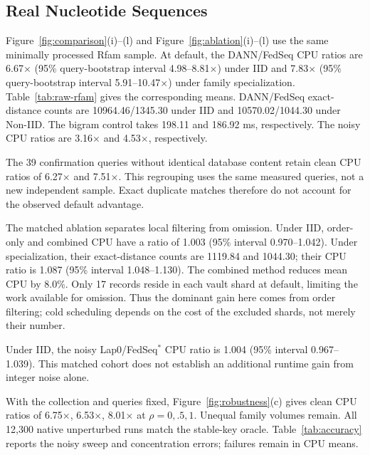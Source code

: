\subsection{Real Nucleotide Sequences}
\label{sec:real}

Figure~\ref{fig:comparison}(i)--(l) and Figure~\ref{fig:ablation}(i)--(l) use the same minimally processed Rfam sample. At default, the DANN/FedSeq CPU ratios are 6.67$\times$ (95\% query-bootstrap interval 4.98--8.81$\times$) under IID and 7.83$\times$ (95\% query-bootstrap interval 5.91--10.47$\times$) under family specialization. Table~\ref{tab:raw-rfam} gives the corresponding means. DANN/FedSeq exact-distance counts are 10964.46/1345.30 under IID and 10570.02/1044.30 under Non-IID. The bigram control takes 198.11 and 186.92 ms, respectively. The noisy CPU ratios are 3.16$\times$ and 4.53$\times$, respectively.

The 39 confirmation queries without identical database content retain clean CPU ratios of 6.27$\times$ and 7.51$\times$. This regrouping uses the same measured queries, not a new independent sample. Exact duplicate matches therefore do not account for the observed default advantage.

The matched ablation separates local filtering from omission. Under IID, order-only and combined CPU have a ratio of 1.003 (95\% interval 0.970--1.042). Under specialization, their exact-distance counts are 1119.84 and 1044.30; their CPU ratio is 1.087 (95\% interval 1.048--1.130). The combined method reduces mean CPU by 8.0\%. Only 17 records reside in each vault shard at default, limiting the work available for omission. Thus the dominant gain here comes from order filtering; cold scheduling depends on the cost of the excluded shards, not merely their number.

Under IID, the noisy Lap0/FedSeq$^*$ CPU ratio is 1.004 (95\% interval 0.967--1.039). This matched cohort does not establish an additional runtime gain from integer noise alone.

With the collection and queries fixed, Figure~\ref{fig:robustness}(c) gives clean CPU ratios of 6.75$\times$, 6.53$\times$, 8.01$\times$ at $\rho=0,.5,1$. Unequal family volumes remain. All 12,300 native unperturbed runs match the stable-key oracle. Table~\ref{tab:accuracy} reports the noisy sweep and concentration errors; failures remain in CPU means.
